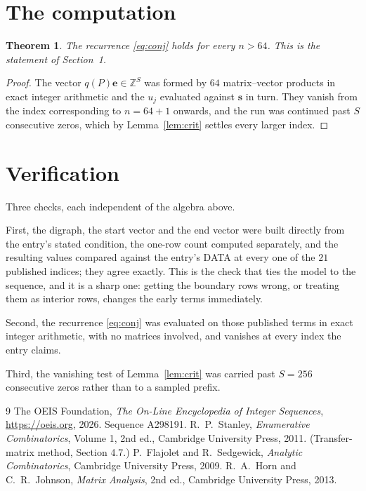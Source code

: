 \documentclass[11pt,a4paper]{article}
\theoremstyle{plain}
\newtheorem{theorem}{Theorem}
\theoremstyle{definition}
\begin{document}
\section{The computation}

\begin{theorem}
The recurrence \eqref{eq:conj} holds for every $n>64$. This is the statement of
Section~1.
\end{theorem}

\begin{proof}
The vector $q(P)\mathbf{e}\in\mathbb{Z}^{S}$ was formed by $64$ matrix--vector
products in exact integer arithmetic and the $u_j$ evaluated against $\mathbf{s}$ in turn.
They vanish from the index corresponding to $n=64+1$ onwards, and the run was continued
past $S$ consecutive zeros, which by Lemma~\ref{lem:crit} settles every larger index.
\end{proof}

\section{Verification}

Three checks, each independent of the algebra above.

First, the digraph, the start vector and the end vector were built directly from the
entry's stated condition, the one-row count computed separately, and the resulting values
compared against the entry's DATA at every one of the $21$ published indices; they
agree exactly. This is the check that ties the model to the sequence, and it is a sharp one:
getting the boundary rows wrong, or treating them as interior rows, changes the early terms
immediately.

Second, the recurrence \eqref{eq:conj} was evaluated on those published terms in exact
integer arithmetic, with no matrices involved, and vanishes at every index the entry claims.

Third, the vanishing test of Lemma~\ref{lem:crit} was carried past $S=256$ consecutive
zeros rather than to a sampled prefix.

\begin{thebibliography}{9}
 The OEIS Foundation, \emph{The On-Line Encyclopedia of Integer
Sequences}, \url{https://oeis.org}, 2026. Sequence A298191.
 R.~P.~Stanley, \emph{Enumerative Combinatorics}, Volume 1, 2nd ed.,
Cambridge University Press, 2011. (Transfer-matrix method, Section 4.7.)
 P.~Flajolet and R.~Sedgewick, \emph{Analytic Combinatorics}, Cambridge
University Press, 2009.
 R.~A.~Horn and C.~R.~Johnson, \emph{Matrix Analysis}, 2nd ed., Cambridge
University Press, 2013.
\end{thebibliography}
\end{document}
